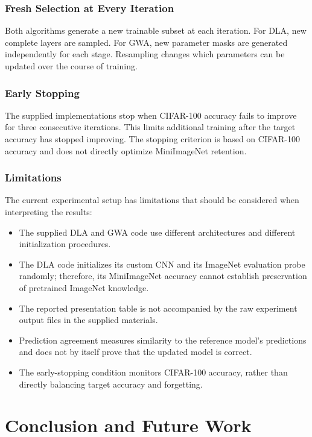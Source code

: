 \documentclass[12pt,a4paper]{report}
\begin{document}
\subsection{Fresh Selection at Every Iteration}
Both algorithms generate a new trainable subset at each iteration.
For DLA, new complete layers are sampled. For GWA, new parameter masks
are generated independently for each stage. Resampling changes which
parameters can be updated over the course of training.

\subsection{Early Stopping}
The supplied implementations stop when CIFAR-100 accuracy fails to
improve for three consecutive iterations. This limits additional
training after the target accuracy has stopped improving. The stopping
criterion is based on CIFAR-100 accuracy and does not directly optimize
MiniImageNet retention.

\subsection{Limitations}
The current experimental setup has limitations that should be
considered when interpreting the results:
\begin{itemize}
    \item The supplied DLA and GWA code use different architectures
    and different initialization procedures.
    \item The DLA code initializes its custom CNN and its ImageNet
    evaluation probe randomly; therefore, its MiniImageNet accuracy
    cannot establish preservation of pretrained ImageNet knowledge.
    \item The reported presentation table is not accompanied by the
    raw experiment output files in the supplied materials.
    \item Prediction agreement measures similarity to the reference
    model's predictions and does not by itself prove that the updated
    model is correct.
    \item The early-stopping condition monitors CIFAR-100 accuracy,
    rather than directly balancing target accuracy and forgetting.
\end{itemize}

\chapter{Conclusion and Future Work}
\end{document}
